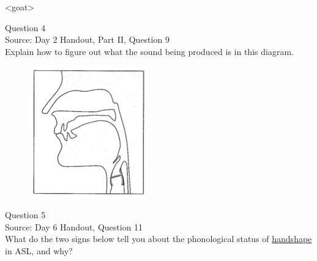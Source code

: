 \documentclass[12pt]{article}
\begin{document}
<goat>


\newpage

{\large Question 4}\\

Source: Day 2 Handout, Part II, Question 9\\

Explain how to figure out what the sound being produced is in this diagram.\\

\begin{figure}[H]
\includegraphics{../images/sagittal_m.png}
\end{figure}

\newpage

{\large Question 5}\\

Source: Day 6 Handout, Question 11\\

What do the two signs below tell you about the phonological status of \underline{handshape} in ASL, and why?\\
\end{document}
